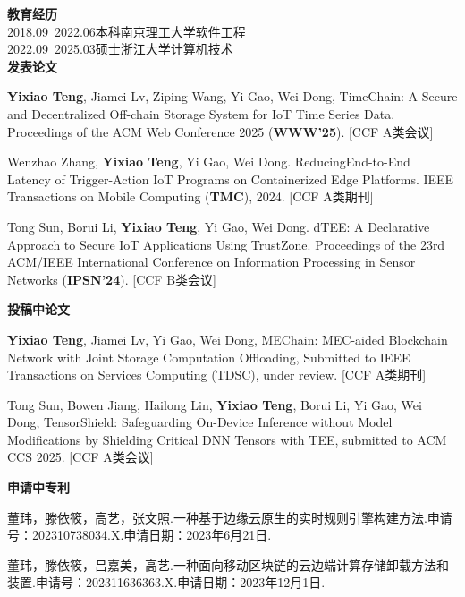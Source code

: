 \cleardoublepage
{}
\noindent\textbf{教育经历}\\
2018.09~2022.06\quad  本科\quad  南京理工大学\quad  软件工程\\
2022.09~2025.03\quad  硕士\quad  浙江大学\quad \quad \quad  计算机技术\\


\noindent\textbf{发表论文}
\begin{enumerate}[label={[\arabic*]},leftmargin=*]
\item \textbf{Yixiao Teng}, Jiamei Lv, Ziping Wang, Yi Gao, Wei Dong, TimeChain: A Secure and Decentralized Off-chain Storage System for IoT Time Series Data. Proceedings of the ACM Web Conference 2025 (\textbf{WWW'25}). [CCF A类会议]
\item Wenzhao Zhang, \textbf{Yixiao Teng}, Yi Gao, Wei Dong. ReducingEnd-to-End Latency of Trigger-Action IoT Programs on Containerized Edge Platforms. IEEE Transactions on Mobile Computing (\textbf{TMC}), 2024. [CCF A类期刊]
\item Tong Sun, Borui Li, \textbf{Yixiao Teng}, Yi Gao, Wei Dong. dTEE: A Declarative Approach to Secure IoT Applications Using TrustZone. Proceedings of the 23rd ACM/IEEE International Conference on Information Processing in Sensor Networks (\textbf{IPSN'24}). [CCF B类会议]\\
\end{enumerate}

\noindent\textbf{投稿中论文}
\begin{enumerate}[label={[\arabic*]},leftmargin=*]
    \item \textbf{Yixiao Teng}, Jiamei Lv, Yi Gao, Wei Dong, MEChain: MEC-aided Blockchain Network with Joint Storage Computation Offloading, Submitted to IEEE Transactions on Services Computing (TDSC), under review. [CCF A类期刊]
    \item Tong Sun, Bowen Jiang, Hailong Lin, \textbf{Yixiao Teng}, Borui Li, Yi Gao, Wei Dong, TensorShield: Safeguarding On-Device Inference without Model Modifications by Shielding Critical DNN Tensors with TEE, submitted to ACM CCS 2025. [CCF A类会议]\\
\end{enumerate}

\noindent\textbf{申请中专利}
\begin{enumerate}[label={[\arabic*]},leftmargin=*]
    \item 董玮，滕依筱，高艺，张文照.一种基于边缘云原生的实时规则引擎构建方法.申请号：202310738034.X.申请日期：2023年6月21日.
    \item 董玮，滕依筱，吕嘉美，高艺.一种面向移动区块链的云边端计算存储卸载方法和装置.申请号：202311636363.X.申请日期：2023年12月1日.
\end{enumerate}